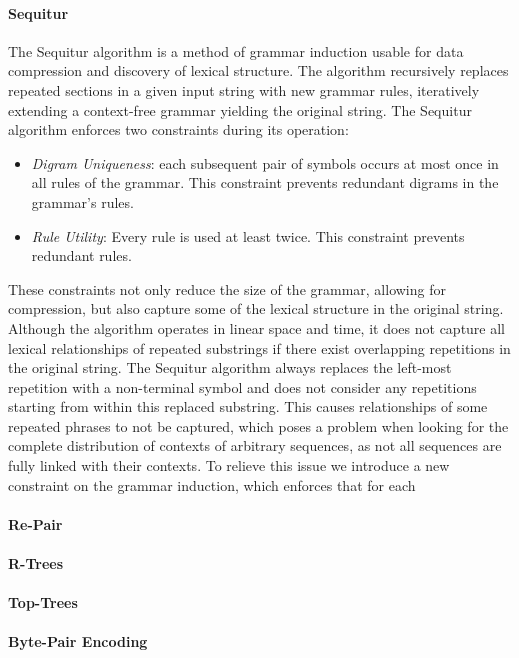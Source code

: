 \documentclass[10pt]{report}
\begin{document}
\paragraph{Sequitur}
The Sequitur algorithm \cite{nevill1997identifying} is a method of grammar induction 
usable for data compression and discovery of lexical structure. The algorithm 
recursively replaces repeated sections in a given input string with new grammar rules, iteratively extending a context-free grammar yielding the original string. The Sequitur algorithm enforces two constraints during its operation:
\begin{itemize}
    \item \textit{Digram Uniqueness}: each subsequent pair of symbols occurs at most once in all rules of the grammar. This constraint prevents redundant digrams in the grammar's rules.
    \item \textit{Rule Utility}: Every rule is used at least twice. This constraint prevents redundant rules.
\end{itemize}
These constraints not only reduce the size of the grammar, allowing for compression, but also capture some of the lexical structure in the original string. Although the algorithm operates in linear space and time, it does not capture all lexical relationships of repeated substrings if there exist overlapping repetitions in the original string. The Sequitur algorithm always replaces the left-most repetition with a non-terminal symbol and does not consider any repetitions starting from within this replaced substring. This causes relationships of some repeated phrases to not be captured, which poses a problem when looking for the complete distribution of contexts of arbitrary sequences, as not all sequences are fully linked with their contexts.
To relieve this issue we introduce a new constraint on the grammar induction, which enforces that for each 


\paragraph{Re-Pair}
\paragraph{R-Trees}
\paragraph{Top-Trees}
\paragraph{Byte-Pair Encoding}
\end{document}

